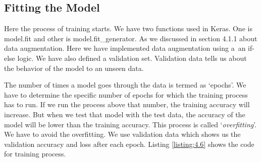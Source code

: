 \subsection{Fitting the Model}
Here the process of training starts. We have two functions used in Keras. One
is model.fit and other is model.fit\_generator. As we discussed in section 4.1.1
about data augmentation. Here we have implemented data augmentation using a\
an if-else logic. We have also defined a validation set. Validation data tells us about the
behavior of the model to an unseen data.

The number of times a model goes through the data is termed as `epochs'.
We have to determine the specific number of epochs for which the training process has to
run. If we run the process above that number, the training accuracy will
increase. But when we test that model with the test data, the accuracy of the model
will be lower than the training accuracy. This process is called `\textit{overfitting}'.
We have to avoid the overfitting. We use validation data which shows us the validation accuracy
and loss after each epoch. Listing \ref{listing:4.6} shows the code for training process.

